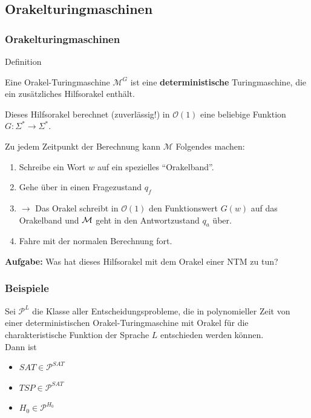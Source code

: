 \subsection{Orakelturingmaschinen}
\begin{frame}
\frametitle{Orakelturingmaschinen}
\begin{block}{Definition}

Eine Orakel-Turingmaschine $\mathcal{M}^G$ ist eine \textbf{deterministische} Turingmaschine, die ein zusätzliches Hilfsorakel enthält. \micropause

Dieses Hilfsorakel berechnet (zuverlässig!) in $\mathcal{O}(1)$ eine beliebige Funktion $G: \Sigma^* \rightarrow \Sigma^*$. \micropause

Zu jedem Zeitpunkt der Berechnung kann $\mathcal{M}$ Folgendes machen:
\begin{enumerate}
	\item Schreibe ein Wort $w$ auf ein spezielles "`Orakelband"'.
	\item Gehe über in einen Fragezustand $q_f$
	\item $\rightarrow$ Das Orakel schreibt in $\mathcal{O}(1)$ den Funktionswert $G(w)$ auf das Orakelband und $\mathcal{M}$ geht in den Antwortzustand $q_a$ über.
	\item Fahre mit der normalen Berechnung fort.
\end{enumerate} \ducttape{8pt}

\pause \textbf{Aufgabe:} Was hat dieses Hilfsorakel mit dem Orakel einer NTM zu tun? 


\end{block}
\end{frame}

\begin{frame}
\frametitle{Beispiele}
Sei $\mathcal{P}^L$ die Klasse aller Entscheidungsprobleme, die in polynomieller Zeit von einer deterministischen Orakel-Turingmaschine mit Orakel für die charakteristische Funktion der Sprache $L$ entschieden werden können.\\
Dann ist
\begin{itemize}
\item $SAT \in \mathcal{P}^{SAT}$
\item $TSP \in \mathcal{P}^{SAT}$ 
\item $H_0 \in \mathcal{P}^{H_0}$
\end{itemize}
\end{frame}

